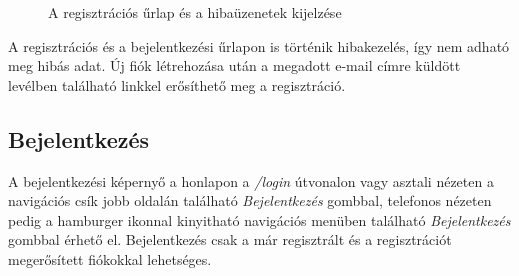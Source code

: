 \begin{figure}[H]
  \caption{A regisztrációs űrlap és a hibaüzenetek kijelzése}
\end{figure}

A regisztrációs és a bejelentkezési űrlapon is történik hibakezelés, így nem adható meg hibás adat. Új fiók létrehozása után a megadott e-mail címre küldött levélben található linkkel erősíthető meg a regisztráció.

\subsection{Bejelentkezés}
A bejelentkezési képernyő a honlapon a \emph{/login} útvonalon vagy asztali nézeten a navigációs csík jobb oldalán található \emph{Bejelentkezés} gombbal, telefonos nézeten pedig a hamburger ikonnal kinyitható navigációs menüben található \emph{Bejelentkezés} gombbal érhető el. Bejelentkezés csak a már regisztrált és a regisztrációt megerősített fiókokkal lehetséges.

